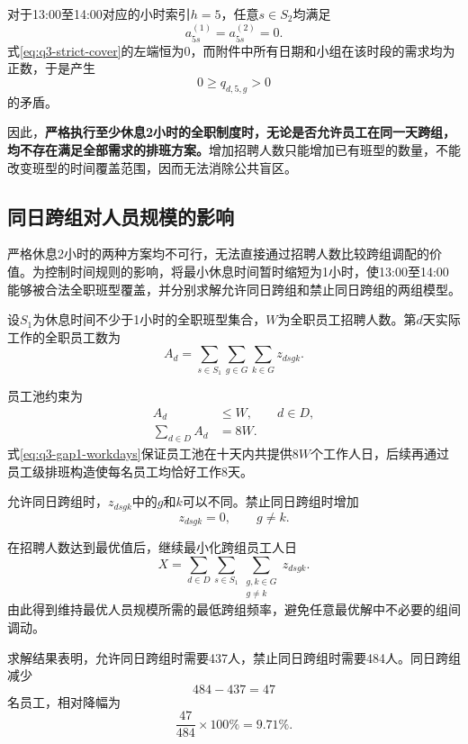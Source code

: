 \documentclass[withoutpreface,bwprint]{cumcmthesis}
\begin{document}
对于13:00至14:00对应的小时索引$h=5$，任意$s\in S_2$均满足
\[
a^{(1)}_{5s}=a^{(2)}_{5s}=0.
\]
式\eqref{eq:q3-strict-cover}的左端恒为0，而附件中所有日期和小组在该时段的需求均为正数，于是产生
\[
0\geq q_{d,5,g}>0
\]
的矛盾。

因此，\textbf{严格执行至少休息2小时的全职制度时，无论是否允许员工在同一天跨组，均不存在满足全部需求的排班方案。}增加招聘人数只能增加已有班型的数量，不能改变班型的时间覆盖范围，因而无法消除公共盲区。

\subsection{同日跨组对人员规模的影响}

严格休息2小时的两种方案均不可行，无法直接通过招聘人数比较跨组调配的价值。为控制时间规则的影响，将最小休息时间暂时缩短为1小时，使13:00至14:00能够被合法全职班型覆盖，并分别求解允许同日跨组和禁止同日跨组的两组模型。

设$S_1$为休息时间不少于1小时的全职班型集合，$W$为全职员工招聘人数。第$d$天实际工作的全职员工数为
\begin{equation}
A_d
=
\sum_{s\in S_1}\sum_{g\in G}\sum_{k\in G}z_{dsgk}.
\label{eq:q3-gap1-daily}
\end{equation}

员工池约束为
\begin{align}
A_d&\leq W,
&&d\in D,\label{eq:q3-gap1-pool}\\
\sum_{d\in D}A_d&=8W.
\label{eq:q3-gap1-workdays}
\end{align}
式\eqref{eq:q3-gap1-workdays}保证员工池在十天内共提供$8W$个工作人日，后续再通过员工级排班构造使每名员工均恰好工作8天。

允许同日跨组时，$z_{dsgk}$中的$g$和$k$可以不同。禁止同日跨组时增加
\begin{equation}
z_{dsgk}=0,
\qquad g\neq k.
\label{eq:q3-no-cross}
\end{equation}

在招聘人数达到最优值后，继续最小化跨组员工人日
\begin{equation}
X
=
\sum_{d\in D}
\sum_{s\in S_1}
\sum_{\substack{g,k\in G\\g\neq k}}
z_{dsgk}.
\label{eq:q3-cross-days}
\end{equation}
由此得到维持最优人员规模所需的最低跨组频率，避免任意最优解中不必要的组间调动。

求解结果表明，允许同日跨组时需要437人，禁止同日跨组时需要484人。同日跨组减少
\begin{equation}
484-437=47
\end{equation}
名员工，相对降幅为
\begin{equation}
\frac{47}{484}\times100\%=9.71\%.
\label{eq:q3-gap1-cross-saving}
\end{equation}
\end{document}
